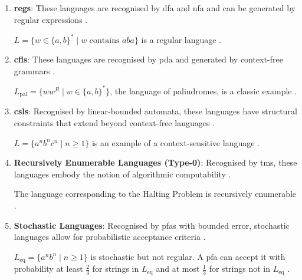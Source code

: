 \begin{enumerate}
    \item \textbf{\glspl{reg}}:  
    These languages are recognised by \gls{dfa} and \gls{nfa} and can be generated by regular expressions \cite{hopcroft2006introduction}. 
    \begin{example}
    $L = \{w \in \{a, b\}^\ast \mid w \text{ contains } aba\}$ is a regular language \cite{hopcroft2006introduction}.
    \end{example}
    
    \item \textbf{\glspl{cfl}}:  
    These languages are recognised by \gls{pda} and generated by context-free grammars \cite{chomsky1956three, hopcroft2006introduction}.  
    \begin{example}
    $L_{\text{pal}} = \{ww^R \mid w \in \{a, b\}^\ast\}$, the language of palindromes, is a classic example \cite{chomsky1956three}.
    \end{example}

    \item \textbf{\glspl{csl}}:  
    Recognised by linear-bounded automata, these languages have structural constraints that extend beyond context-free languages \cite{chomsky1956three, hopcroft2006introduction}.  
    \begin{example}
    $L = \{a^n b^n c^n \mid n \geq 1\}$ is an example of a context-sensitive language \cite{chomsky1956three}.
    \end{example}

    \item \textbf{Recursively Enumerable Languages (Type-0)}:  
    Recognised by \glspl{tm}, these languages embody the notion of algorithmic computability \cite{hopcroft2006introduction, turing1936computable}.  
    \begin{example}
    The language corresponding to the Halting Problem is recursively enumerable \cite{hopcroft2006introduction}.
    \end{example}

    \item \textbf{Stochastic Languages}:  
    Recognised by \glspl{pfa} with bounded error, stochastic languages allow for probabilistic acceptance criteria \cite{rabin1963probabilistic}.  
    \begin{example}
    $L_{\text{eq}} = \{a^n b^n \mid n \geq 1\}$ is stochastic but not regular. A \gls{pfa} can accept it with probability at least $\frac{2}{3}$ for strings in $L_{\text{eq}}$ and at most $\frac{1}{3}$ for strings not in $L_{\text{eq}}$ \cite{rabin1963probabilistic}.
    \end{example}
\end{enumerate}

